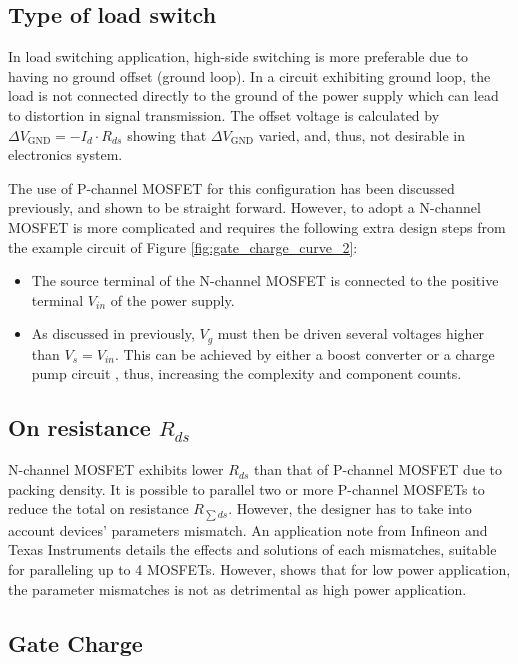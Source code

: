 \documentclass[main.tex]{subfiles}
\begin{document}
    \pagebreak
    \subsection{Type of load switch}
    \justify
    In load switching application, high-side switching is more preferable due to having no ground offset (ground loop). In a circuit exhibiting ground loop, the load is not connected directly to the ground of the power supply which can lead to distortion in signal transmission. The offset voltage is calculated by $\Delta V_\text{GND} = -I_d \cdot R_{ds}$ showing that $\Delta V_\text{GND}$ varied, and, thus, not desirable in electronics system. 
    
    \justify
    The use of P-channel MOSFET for this configuration has been discussed previously, and shown to be straight forward. However, to adopt a N-channel MOSFET is more complicated and requires the following extra design steps from the example circuit of Figure \ref{fig:gate_charge_curve_2}:
    \begin{itemize} 
        \item The source terminal of the N-channel MOSFET is connected to the positive terminal $V_{in}$ of the power supply. 
        \item As discussed in previously, $V_g$ must then be driven several voltages higher than $V_s = V_{in}$. This can be achieved by either a boost converter or a charge pump circuit \cite{InfineonNMOSHighDrive}, thus, increasing the complexity and component counts.
    \end{itemize}
    \subsection{On resistance $R_{ds}$}
    N-channel MOSFET exhibits lower $R_{ds}$ than that of P-channel MOSFET due to packing density. It is possible to parallel two or more P-channel MOSFETs to reduce the total on resistance $R_{\sum ds}$. However, the designer has to take into account devices' parameters mismatch. An application note from Infineon and Texas Instruments \cite{InfineonParallelMOS} details the effects and solutions of each mismatches, suitable for paralleling up to 4 MOSFETs. However, \cite{MOSFET_parallel_low_power} shows that for low power application, the parameter mismatches is not as detrimental as high power application.
    
    \pagebreak
    \subsection{Gate Charge}
\end{document}
